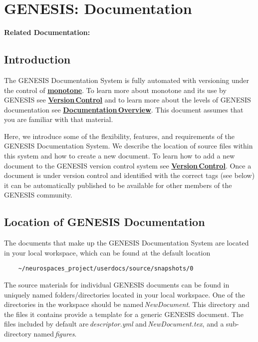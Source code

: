 \documentclass[12pt]{article}
\begin{document}
\section*{GENESIS: Documentation}

{\bf Related Documentation:}

\subsection*{Introduction}

The GENESIS Documentation System is fully automated with versioning under the control of \href{http://monotone.ca/}{\bf monotone}. To learn more about monotone and its use by GENESIS see \href{../version-control/version-control.tex}{\bf Version\,Control} and to learn more about the levels of GENESIS documentation see \href{../documentation-overview/documentation-overview.tex}{\bf Documentation\,Overview}. This document assumes that you are familiar with that material.

Here, we introduce some of the flexibility, features, and requirements of the GENESIS Documentation System. We describe the location of source files within this system and how to create a new document. To learn how to add a new document to the GENESIS version control system see \href{../version-control/version-control.tex}{\bf Version\,Control}. Once a document is under version control and identified with the correct tags (see below) it can be automatically published to be available for other members of the GENESIS community.

\subsection*{Location of GENESIS Documentation}

The documents that make up the GENESIS Documentation System are located in your local workspace, which can be found at the default location
\begin{verbatim}
    ~/neurospaces_project/userdocs/source/snapshots/0
\end{verbatim}
The source materials for individual GENESIS documents can be found in uniquely named folders/directories located in your local workspace. One of the directories in the workspace should be named\,{\it NewDocument}. This directory and the files it contains provide a template for a generic GENESIS document. The files included by default are\,{\it descriptor.yml} and\,{\it NewDocument.tex}, and a sub-directory named\,{\it figures}.
\end{document}
